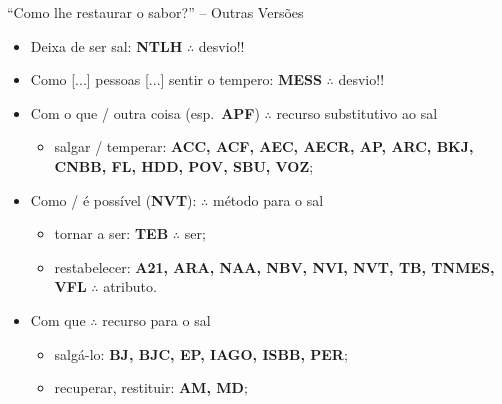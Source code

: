 \documentclass[12pt,aspectratio=169]{beamer}
\newcommand{\RED}[1]{{\textcolor{TXred}{#1}}}
\newcommand{\ORA}[1]{{\textcolor{TXora}{#1}}}
\newcommand{\YEL}[1]{{\textcolor{TXyel}{#1}}}
\newcommand{\BRI}[1]{{\textcolor{BSpbg}{#1}}}   %
\begin{document}
    \begin{frame}{\BRI{``Como lhe restaurar o sabor?''} -- Outras Versões}
        \begin{itemize}
            \item<1-> \RED{Deixa de ser sal}:
                \BRI{\textbf{NTLH}}
                $\therefore$ desvio!!
            \item<1-> \RED{Como [...] pessoas [...] sentir o tempero}:
                \BRI{\textbf{MESS}}
                $\therefore$ desvio!!
            \item<2-> \ORA{Com o que} / \ORA{outra coisa} (esp.~\BRI{\bf APF})
                $\therefore$ recurso substitutivo ao sal
                \begin{itemize}
                    \item \ORA{salgar} / \ORA{temperar}:
                        \BRI{\textbf{ACC, ACF, AEC, AECR, AP, ARC, BKJ, CNBB, FL, HDD, POV, SBU,
                            VOZ}};
                \end{itemize}
            \item<3-> \YEL{Como} / \YEL{é possível} (\BRI{\bf NVT}):
                $\therefore$ método para o sal
                \begin{itemize}
                    \item \YEL{tornar a ser}:
                        \BRI{\textbf{TEB}}
                        $\therefore$ ser;
                    \item \YEL{restabelecer}:
                        \BRI{\textbf{A21, ARA, NAA, NBV, NVI, NVT, TB, TNMES, VFL}}
                        $\therefore$ atributo.
                \end{itemize}
            \item<3-> \YEL{Com que}
                $\therefore$ recurso para o sal
                \begin{itemize}
                    \item \YEL{salgá-lo}:
                        \BRI{\textbf{BJ, BJC, EP, IAGO, ISBB, PER}};
                    \item \YEL{recuperar, restituir}:
                        \BRI{\textbf{AM, MD}};
                \end{itemize}
        \end{itemize}
    \end{frame}
\end{document}
